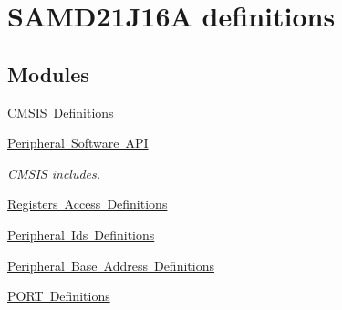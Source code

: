 \hypertarget{group___s_a_m_d21_j16_a__definitions}{}\section{S\+A\+M\+D21\+J16A definitions}
\label{group___s_a_m_d21_j16_a__definitions}
\subsection*{Modules}
\begin{DoxyCompactItemize}
\item 
\mbox{\hyperlink{group___s_a_m_d21_j16_a__cmsis}{C\+M\+S\+I\+S Definitions}}
\item 
\mbox{\hyperlink{group___s_a_m_d21_j16_a__api}{Peripheral Software A\+PI}}
\begin{DoxyCompactList}\small\item\em C\+M\+S\+IS includes. \end{DoxyCompactList}\item 
\mbox{\hyperlink{group___s_a_m_d21_j16_a__reg}{Registers Access Definitions}}
\item 
\mbox{\hyperlink{group___s_a_m_d21_j16_a__id}{Peripheral Ids Definitions}}
\item 
\mbox{\hyperlink{group___s_a_m_d21_j16_a__base}{Peripheral Base Address Definitions}}
\item 
\mbox{\hyperlink{group___s_a_m_d21_j16_a__port}{P\+O\+R\+T Definitions}}
\end{DoxyCompactItemize}
